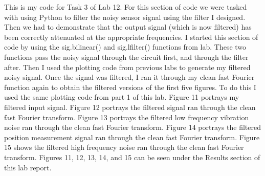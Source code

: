 \documentclass[12pt]{report}
\begin{document}
{This is my code for Task 3 of Lab 12. For this section of code we were tasked with using Python to filter the noisy sensor signal using the filter I designed. Then we had to demonstrate that the output signal (which is now filtered) has been correctly attenuated at the appropriate frequencies. I started this section of code by using the sig.bilinear() and sig.lfilter() functions from lab. These two functions pass the noisy signal through the circuit first, and through the filter after. Then I used the plotting code from previous labs to generate my filtered noisy signal. Once the signal was filtered, I ran it through my clean fast Fourier function again to obtain the filtered versions of the first five figures. To do this I used the same plotting code from part 1 of this lab. Figure 11 portrays my filtered input signal. Figure 12 portrays the filtered signal ran through the clean fast Fourier transform. Figure 13 portrays the filtered low frequency vibration noise ran through the clean fast Fourier transform. Figure 14 portrays the filtered position measurement signal ran through the clean fast Fourier transform. Figure 15 shows the filtered high frequency noise ran through the clean fast Fourier transform. Figures 11, 12, 13, 14, and 15 can be seen under the Results section of this lab report. }
\end{document}
